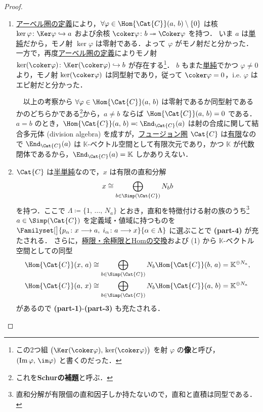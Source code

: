 \documentclass[TQFT_main]{subfiles}
\begin{document}
\begin{proof}
    \begin{enumerate}
        \item \hyperref[def:additive-cat]{アーベル圏の定義}により，$\forall \varphi \in \Hom{\Cat{C}}(a,\, b) \setminus \{0\}$ は核 $\ker \varphi \colon \Ker \varphi \hookrightarrow a$ および余核 $\coker \varphi \colon b \twoheadrightarrow \Coker \varphi$ を持つ．
        いま $a$ は\hyperref[def:semisimple-cat]{単純}だから，モノ射 $\ker \varphi$ は零射である．よって $\varphi$ がモノ射だと分かった．
        一方で，再度\hyperref[def:additive-cat]{アーベル圏の定義}によりモノ射 $\ker (\coker \varphi) \colon \Ker (\coker \varphi) \hookrightarrow b$ が存在する\footnote{この2つ組 $\bigl(\Ker (\coker \varphi),\, \ker (\coker \varphi)\bigr)$ を射 $\varphi$ の\textbf{像}と呼び，$(\Im \varphi,\, \im \varphi)$ と書くのだった．}．
        $b$ もまた\hyperref[def:semisimple-cat]{単純}でかつ $\varphi \neq 0$ より，モノ射 $\ker (\coker \varphi)$ は同型射であり，従って $\coker \varphi = 0$，i.e. $\varphi$ はエピ射だと分かった．

        　以上の考察から $\forall \varphi \in \Hom{\Cat{C}}(a,\, b)$ は零射であるか同型射であるかのどちらかである\footnote{これを\textbf{Schurの補題}と呼ぶ．}から，$a \neq b$ ならば $\Hom{\Cat{C}}(a,\, b) = 0$ である．$a = b$ のとき，$\Hom{\Cat{C}}(a,\, b) \eqqcolon \End_{\Cat{C}}(a)$ は射の合成に関して結合多元体 (division algebra) を成すが，\hyperref[def:tensorfusion-cat]{フュージョン圏} $\Cat{C}$ は\hyperref[def:finite-abcat]{有限}なので $\End_{\Cat{C}}(a)$ は $\mathbb{K}$-ベクトル空間として有限次元であり，かつ $\mathbb{K}$ が代数閉体であるから，$\End_{\Cat{C}}(a) = \mathbb{K}$ しかありえない．

        \item $\Cat{C}$ は\hyperref[def:semisimple-cat]{半単純}なので，$x$ は有限の直和分解
        \begin{align}
            x \cong \bigoplus_{b \in \Simp(\Cat{C})} N_b b
        \end{align}
        を持つ．ここで $\Lambda \coloneqq \{1,\, \dots,\, N_a\}$ とおき，直和を特徴付ける射の族のうち\footnote{直和分解が有限個の直和因子しか持たないので，直和と直積は同型である．} $a \in \Simp(\Cat{C})$ を定義域・値域に持つものを $\Familyset[\big]{p_\alpha \colon x \lto a,\; i_\alpha \colon a \lto x}{\alpha \in \Lambda}$ に選ぶことで \textsf{\textbf{(part-4)}} が充たされる．
        さらに，\hyperref[prop:lim-colim-basic]{極限・余極限とHomの交換}および (1) から $\mathbb{K}$-ベクトル空間としての同型
        \begin{align}
            \Hom{\Cat{C}}(x,\, a) &\cong \bigoplus_{b \in \Simp(\Cat{C})} N_b \Hom{\Cat{C}}(b,\, a) = \mathbb{K}^{\oplus N_a}, \\
            \Hom{\Cat{C}}(a,\, x) &\cong \bigoplus_{b \in \Simp(\Cat{C})} N_b \Hom{\Cat{C}}(a,\, b) = \mathbb{K}^{\oplus N_a}
        \end{align}
        があるので \textsf{\textbf{(part-1)}}-\textsf{\textbf{(part-3)}} も充たされる．
    \end{enumerate}
\end{proof}
\end{document}
